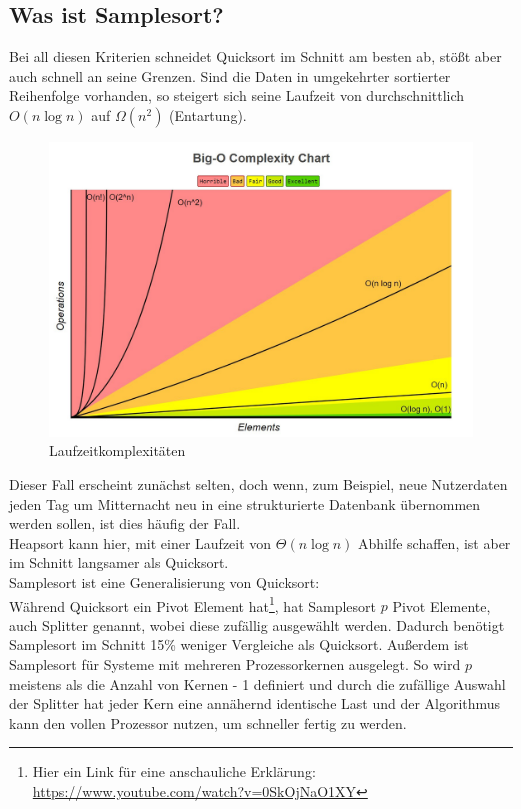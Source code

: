 	\subsection{Was ist Samplesort?}
		Bei all diesen Kriterien schneidet Quicksort im Schnitt am besten ab, stößt aber auch schnell an seine Grenzen. 
		Sind die Daten in umgekehrter sortierter Reihenfolge vorhanden, so steigert sich seine Laufzeit von durchschnittlich $O(n\log{n})$ auf $\Omega(n^2)$ (Entartung).\\
		\begin{figure}
			\caption{Laufzeitkomplexitäten \autocite{unknown-author-2021}}
			\centering
			\includegraphics[width=\paperwidth-2in]{bigo.jpeg}
		\end{figure}
		Dieser Fall erscheint zunächst selten, doch wenn, zum Beispiel, neue Nutzerdaten jeden Tag um Mitternacht neu in eine strukturierte Datenbank übernommen werden sollen, ist dies häufig der Fall.\\
		Heapsort kann hier, mit einer Laufzeit von $\Theta(n\log{n})$ Abhilfe schaffen, ist aber im Schnitt langsamer als Quicksort.\\
		Samplesort ist eine Generalisierung von Quicksort:\\
		Während Quicksort ein Pivot Element hat\footnote{Hier ein Link für eine anschauliche Erklärung: \hyperlink{https://www.youtube.com/watch?v=0SkOjNaO1XY}{https://www.youtube.com/watch?v=0SkOjNaO1XY}}, hat Samplesort $p$ Pivot Elemente, auch Splitter genannt, wobei diese zufällig ausgewählt werden.
		Dadurch benötigt Samplesort im Schnitt 15\% weniger Vergleiche als Quicksort. \autocite{frazer-1970}
		Außerdem ist Samplesort für Systeme mit mehreren Prozessorkernen ausgelegt.
		So wird $p$ meistens als die Anzahl von Kernen - 1 definiert und durch die zufällige Auswahl der Splitter hat jeder Kern eine annähernd identische Last und der Algorithmus kann den vollen Prozessor nutzen, um schneller fertig zu werden.\\
